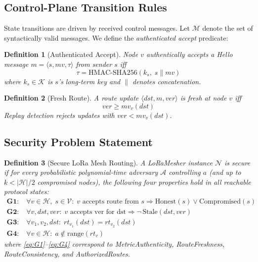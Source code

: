 \documentclass[preprint,12pt]{elsarticle}
\newtheorem{definition}{Definition}
\begin{document}
\subsection{Control-Plane Transition Rules}

State transitions are driven by received control messages.
Let $\mathcal{M}$ denote the set of syntactically valid messages.
We define the \emph{authenticated accept} predicate:

\begin{definition}[Authenticated Accept]
Node $v$ \emph{authentically accepts} a Hello message
$m = \langle s, mv, \tau \rangle$ from sender $s$ iff
\begin{equation}
  \tau = \mathrm{HMAC\text{-}SHA256}(k_s,\; s \| mv)
  \label{eq:hmac-hello}
\end{equation}
where $k_s \in \mathcal{K}$ is $s$'s long-term key and
$\|$ denotes concatenation.
\end{definition}

\begin{definition}[Fresh Route]
A route update $\langle \mathit{dst}, m, \mathit{ver} \rangle$
is \emph{fresh} at node $v$ iff
\begin{equation}
  \mathit{ver} \geq mv_v(\mathit{dst})
  \label{eq:freshness}
\end{equation}
Replay detection rejects updates with $\mathit{ver} < mv_v(\mathit{dst})$.
\end{definition}

\subsection{Security Problem Statement}

\begin{definition}[Secure LoRa Mesh Routing]
A LoRaMesher instance $\mathcal{N}$ is \emph{secure} if for every
probabilistic polynomial-time adversary $\mathcal{A}$ controlling
$a$ (and up to $k < |\mathcal{H}|/2$ compromised nodes), the
following four properties hold in all reachable protocol states:
\begin{align}
  \textbf{G1:}&\; \forall v \in \mathcal{H},\; s \in \mathcal{V}:\;
    v\text{ accepts route from }s
    \Rightarrow \mathrm{Honest}(s) \vee \mathrm{Compromised}(s)
    \label{eq:G1} \\
  \textbf{G2:}&\; \forall v,\mathit{dst},\mathit{ver}:\;
    v\text{ accepts ver for dst}
    \Rightarrow \neg\, \mathrm{Stale}(\mathit{dst}, \mathit{ver})
    \label{eq:G2} \\
  \textbf{G3:}&\; \forall v_1, v_2,\mathit{dst}:\;
    rt_{v_1}(\mathit{dst}) = rt_{v_2}(\mathit{dst})
    \label{eq:G3} \\
  \textbf{G4:}&\; \forall v \in \mathcal{H}:\;
    a \notin \mathrm{range}(rt_v)
    \label{eq:G4}
\end{align}
where \eqref{eq:G1}--\eqref{eq:G4} correspond to
MetricAuthenticity, RouteFreshness, RouteConsistency, and
AuthorizedRoutes.
\end{definition}
\end{document}
